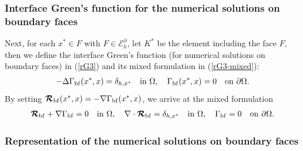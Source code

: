 \documentclass[1996/10/24]{amsart}
\theoremstyle{definition}
\numberwithin{equation}{section}
\begin{document}
\subsubsection{Interface Green's function for the numerical solutions on boundary faces}
\label{sec3:3.4}

Next, for each $x^{\ast}\in F$ with $F\in\mathcal{E}_h^{\partial}$, let $K^{\ast}$ be the element including the
face $F$, then we define the interface Green's function (for numerical solutions on boundary faces) in (\ref{rG3}) and
its mixed formulation in  (\ref{rG3-mixed}):
\begin{align}
-\Delta\Gamma_{{\rm bf}}(x^{\ast},x)=\delta_{h,x^{\ast}}\quad {\rm in}~\Omega,\quad \Gamma_{{\rm bf}}(x^{\ast},x)=0\quad {\rm on}~\partial\Omega.\label{rG3}
\end{align}
By setting $\boldsymbol{\mathcal{R}}_{{\rm bf}}(x^{\ast},x)=-\nabla\Gamma_{{\rm bf}}(x^{\ast},x)$, we arrive at the mixed formulation
\begin{align}
\boldsymbol{\mathcal{R}}_{{\rm bf}}+\nabla\Gamma_{{\rm bf}}=0\quad {\rm in}~\Omega,\quad
\nabla\cdot\boldsymbol{\mathcal{ R}}_{{\rm bf}}=\delta_{h,x^{\ast}}\quad {\rm in}~\Omega,\quad
\Gamma_{{\rm bf}}=0\quad {\rm on}~\partial\Omega.\label{rG3-mixed}
\end{align}

\subsubsection{Representation of the numerical solutions on boundary faces}
\label{sec3:3.5}
\end{document}

